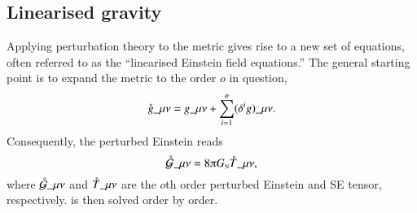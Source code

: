\subsection{Linearised gravity}\label{sec:GR:einstein:lingrav}
{

\newcommand{\pert}{\ALIASpert}           %




Applying perturbation theory to the metric gives rise to a new set of equations, often referred to as the ``linearised Einstein field equations.'' The general starting point is to expand the metric to the order $o$ in question,
\begin{equation}
    \pert{g}\_{\mu\nu} = g\_{\mu\nu}+ \sum_{i=1}^{o} (\delta^{i}g)\_{\mu\nu}.
\end{equation}
Consequently, the perturbed Einstein reads
\begin{equation}\label{eq:GR:einstein:linearised_Einstein_eq}
    \pert{\mathcal{G}}\_{\mu\nu} = 8\ppi G\nped{N} \pert{T}\_{\mu\nu},
\end{equation}
where $\pert{\mathcal{G}}\_{\mu\nu}$ and $\pert{T}\_{\mu\nu}$ are the $o$th order perturbed Einstein and SE tensor, respectively.  is then solved order by order. 

}
